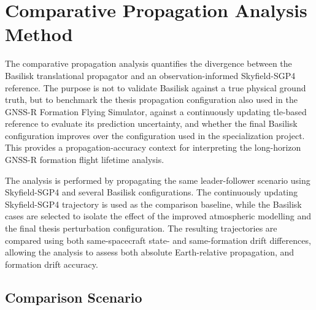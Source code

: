 \section{Comparative Propagation Analysis Method}
\label{sec:comparative_prop_anal_method}
The comparative propagation analysis quantifies the divergence between the Basilisk translational propagator and an observation-informed Skyfield-SGP4 reference. The purpose is not to validate Basilisk against a true physical ground truth, but to benchmark the thesis propagation configuration also used in the GNSS-R Formation Flying Simulator, against a continuously updating \gls{tle}-based reference to evaluate its prediction uncertainty, and whether the final Basilisk configuration improves over the configuration used in the specialization project. This provides a propagation-accuracy context for interpreting the long-horizon GNSS-R formation flight lifetime analysis.

The analysis is performed by propagating the same leader-follower scenario using Skyfield-SGP4 and several Basilisk configurations. The continuously updating Skyfield-SGP4 trajectory is used as the comparison baseline, while the Basilisk cases are selected to isolate the effect of the improved atmospheric modelling and the final thesis perturbation configuration. The resulting trajectories are compared using both same-spacecraft state- and same-formation drift differences, allowing the analysis to assess both absolute Earth-relative propagation, and formation drift accuracy.



\subsection{Comparison Scenario}
\label{sec:comparison_scenario}

